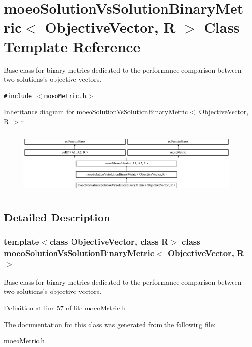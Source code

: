 \section{moeo\-Solution\-Vs\-Solution\-Binary\-Metric$<$ Objective\-Vector, R $>$ Class Template Reference}
\label{classmoeoSolutionVsSolutionBinaryMetric}
Base class for binary metrics dedicated to the performance comparison between two solutions's objective vectors.  


{\tt \#include $<$moeo\-Metric.h$>$}

Inheritance diagram for moeo\-Solution\-Vs\-Solution\-Binary\-Metric$<$ Objective\-Vector, R $>$::\begin{figure}[H]
\begin{center}
\leavevmode
\includegraphics[height=3.30189cm]{classmoeoSolutionVsSolutionBinaryMetric}
\end{center}
\end{figure}


\subsection{Detailed Description}
\subsubsection*{template$<$class Objective\-Vector, class R$>$ class moeo\-Solution\-Vs\-Solution\-Binary\-Metric$<$ Objective\-Vector, R $>$}

Base class for binary metrics dedicated to the performance comparison between two solutions's objective vectors. 



Definition at line 57 of file moeo\-Metric.h.

The documentation for this class was generated from the following file:\begin{CompactItemize}
\item 
moeo\-Metric.h\end{CompactItemize}
